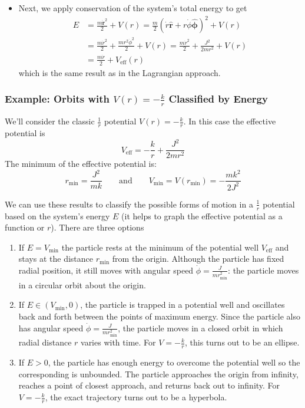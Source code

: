 \documentclass[11pt, a4paper]{article}
\newcommand{\eqtext}[1]{\qquad \text{#1} \qquad}
\newcommand{\uvec}[1]{\hat{\mathbf{#1}}}
\newcommand{\bdot}[1]{\dot{\bm{#1}}}
\newcommand{\veff}{V_{\text{eff}}}
\begin{document}
\begin{itemize}
	\item Next, we apply conservation of the system's total energy to get
	\begin{align*}
		E &= \frac{m \bdot{r}^{2}}{2} + V(r) = \frac{m}{2} \left (\dot{r}\uvec{r} + r \dot{\phi} \uvec{\phi}\right )^{2} + V(r)\\
		&= \frac{m\dot{r}^{2}}{2} + \frac{mr^{2} \dot{\phi}^{2} }{2}+ V(r) = \frac{m\dot{r}^{2}}{2} + \frac{J^{2}}{2mr^{2}} + V(r)\\
		&=\frac{m\dot{r}}{2} + \veff(r)
	\end{align*}
	which is the same result as in the Lagrangian approach.
	
\end{itemize}

\subsubsection{Example: Orbits with $ V(r) = -\frac{k}{r} $ Classified by Energy} 
We'll consider the classic $ \frac{1}{r} $ potential $ V(r) = -\frac{k}{r} $. In this case the effective potential is
\begin{equation*}
	\veff = -\frac{k}{r} + \frac{J^{2}}{2mr^{2}}
\end{equation*}
The minimum of the effective potential is:
\begin{equation*}
	r_{\text{min}} = \frac{J^{2}}{mk} \eqtext{and} V_{\text{min}} = V(r_{\text{min}}) = -\frac{mk^{2}}{2J^{2}}
\end{equation*}

We can use these results to classify the possible forms of motion in a $ \frac{1}{r} $ potential based on the system's energy $ E $ (it helps to graph the effective potential as a function or $ r $). There are three options
\begin{enumerate}
	\item If $ E = V_{\text{min}} $ the particle rests at the minimum of the potential well $ \veff $ and stays at the distance $ r_{\text{min}} $ from the origin. Although the particle has fixed radial position, it still moves with angular speed $ \dot{\phi} = \frac{J}{mr_{\text{min}}^{2}} $: the particle moves in a circular orbit about the origin.
	
	\item If $ E \in (V_{\text{min}}, 0) $, the particle is trapped in a potential well and oscillates back and forth between the points of maximum energy. Since the particle also has angular speed $ \dot{\phi} = \frac{J}{mr_{\text{min}}^{2}} $, the particle moves in a closed orbit in which radial distance $ r $ varies with time. For $ V = - \frac{k}{r} $, this turns out to be an ellipse.
	
	\item If $ E > 0 $, the particle has enough energy to overcome the potential well so the corresponding is unbounded. The particle approaches the origin from infinity, reaches a point of closest approach, and returns back out to infinity. For $ V = - \frac{k}{r} $, the exact trajectory turns out to be a hyperbola.
\end{enumerate}
\end{document}
